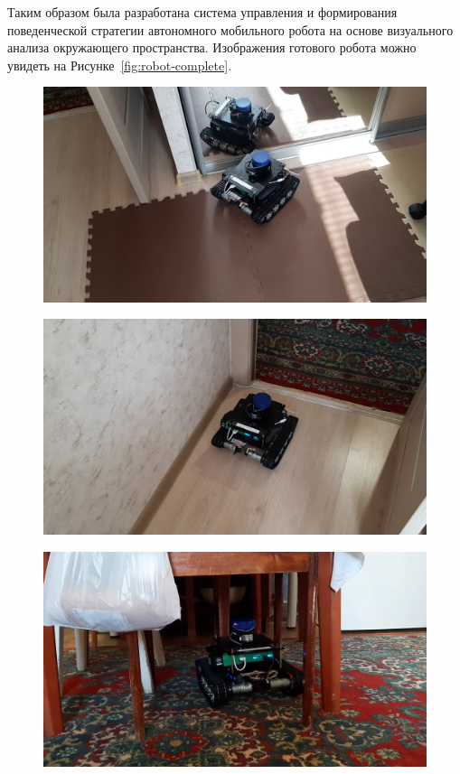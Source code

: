 \documentclass[12pt,a4paper]{scrartcl}
\begin{document}
			Таким образом была разработана система управления и формирования поведенческой стратегии автономного мобильного робота на основе визуального анализа окружающего пространства. Изображения готового робота можно увидеть на Рисунке~\ref{fig:robot-complete}.
			
			\begin{figure}[ht]
  				\begin{minipage}[b][][b]{0.32\linewidth}\centering
  					  \includegraphics[width=1\linewidth]{robot-complete1.jpg} \\
  				\end{minipage}
  				\hfill
  				\begin{minipage}[b][][b]{0.32\linewidth}\centering
 					   \includegraphics[width=1\linewidth]{robot-complete2.jpg} \\
 				 \end{minipage}
 				 \hfill
				  \begin{minipage}[b][][b]{0.32\linewidth}\centering
 					   \includegraphics[width=1\linewidth]{robot-complete3.jpg} \\

\end{minipage}
\end{figure}
\end{document}
